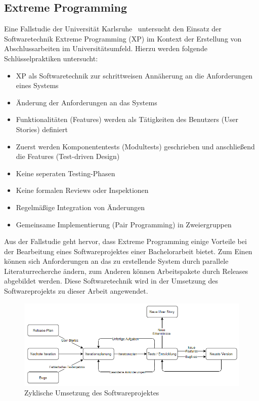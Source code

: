 \subsection*{Extreme Programming}
Eine Fallstudie der Universität Karlsruhe~\cite{muller_2001} untersucht den Einsatz der Softwaretechnik Extreme
Programming (XP) im Kontext der Erstellung von Abschlussarbeiten im Universitätsumfeld.
Hierzu werden folgende Schlüsselpraktiken untersucht:
\begin{itemize}
    \item XP als Softwaretechnik zur schrittweisen Annäherung an die Anforderungen eines Systems
    \item Änderung der Anforderungen an das Systems
    \item Funktionalitäten (Features) werden als Tätigkeiten des Benutzers (User Stories) definiert
    \item Zuerst werden Komponententests (Modultests) geschrieben und anschließend die Features (Test-driven Design)
    \item Keine seperaten Testing-Phasen
    \item Keine formalen Reviews oder Inspektionen
    \item Regelmäßige Integration von Änderungen
    \item Gemeinsame Implementierung (Pair Programming) in Zweiergruppen
\end{itemize}
Aus der Fallstudie geht hervor, dass Extreme Programming einige Vorteile bei der Bearbeitung eines Softwareprojektes
einer Bachelorarbeit bietet.
Zum Einen können sich Anforderungen an das zu erstellende System durch parallele Literaturrecherche ändern, zum
Anderen können Arbeitspakete durch Releases abgebildet werden.
Diese Softwaretechnik wird in der Umsetzung des Softwareprojekts zu dieser Arbeit angewendet.

\begin{figure}[H]
    \centering
    \includegraphics[width=12.8cm]{../images/extreme_programming.png}
    \caption{Zyklische Umsetzung des Softwareprojektes}
\end{figure}

